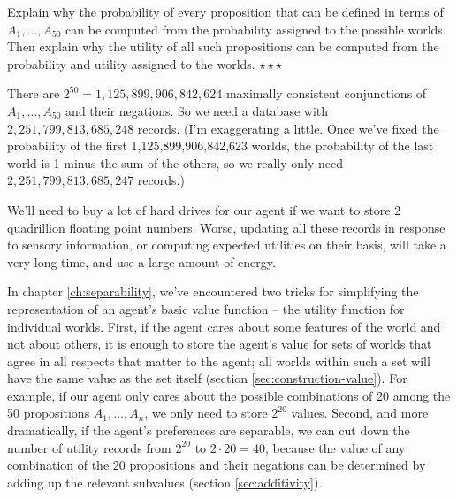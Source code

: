 \begin{exercise}
  Explain why the probability of every proposition that can be defined
  in terms of $A_1,\ldots,A_{50}$ can be computed from the probability
  assigned to the possible worlds. Then explain why the utility of all
  such propositions can be computed from the probability and utility
  assigned to the worlds. $\star\star\star$
\end{exercise}


There are $2^{50} = 1,125,899,906,842,624$ maximally consistent
conjunctions of $A_1,\ldots,A_{50}$ and their negations.  So we need a
database with $2,251,799,813,685,248$ records. (I'm exaggerating a
little. Once we've fixed the probability of the first
1,125,899,906,842,623 worlds, the probability of the last world is 1
minus the sum of the others, so we really only need
$2,251,799,813,685,247$ records.)

We'll need to buy a lot of hard drives for our agent if we want to
store 2 quadrillion floating point numbers. Worse, updating all these
records in response to sensory information, or computing expected
utilities on their basis, will take a very long time, and use a large
amount of energy.

In chapter \ref{ch:separability}, we've encountered two tricks for
simplifying the representation of an agent's basic value function --
the utility function for individual worlds. First, if the agent cares
about some features of the world and not about others, it is enough to
store the agent's value for sets of worlds that agree in all respects
that matter to the agent; all worlds within such a set will have the
same value as the set itself (section
\ref{sec:construction-value}). For example, if our agent only cares
about the possible combinations of 20 among the 50 propositions
$A_1,\ldots,A_n$, we only need to store $2^{20}$ values. Second, and
more dramatically, if the agent's preferences are separable, we can
cut down the number of utility records from $2^{20}$ to $2 \cdot 20 =
40$, because the value of any combination of the 20 propositions and
their negations can be determined by adding up the relevant subvalues
(section \ref{sec:additivity}).

